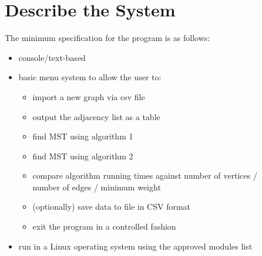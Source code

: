 \section{Describe the System}


The minimum specification for the program is as follows:

\begin{itemize}
    \item console/text-based
    \item basic menu system to allow the user to:
    \begin{itemize}
        \item import a new graph via csv file
        \item output the adjacency list as a table
        \item find MST using algorithm 1
        \item find MST using algorithm 2
        \item compare algorithm running times against number of vertices / \\number of edges / minimum weight
        \item (optionally) save data to file in CSV format
        \item exit the program in a controlled fashion
    \end{itemize}
    \item run in a Linux operating system using the approved modules list
\end{itemize}

